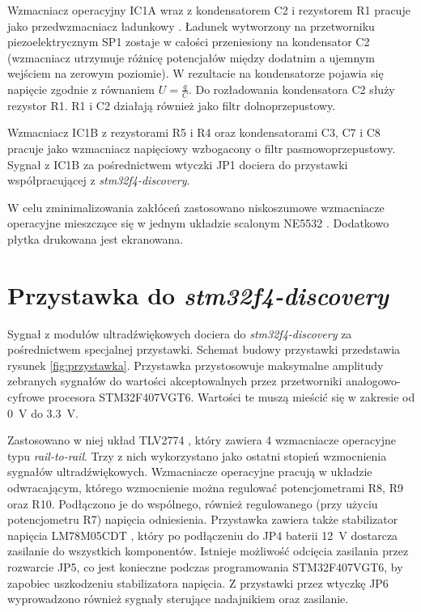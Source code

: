 
Wzmacniacz operacyjny IC1A wraz z kondensatorem C2 i rezystorem R1 pracuje 
jako przedwzmacniacz ładunkowy \cite{bib:wzm_ladunkowy}.
Ładunek wytworzony na przetworniku piezoelektrycznym SP1 zostaje w całości przeniesiony na kondensator C2 
(wzmacniacz utrzymuje różnicę potencjałów między dodatnim a ujemnym wejściem na zerowym poziomie).
W rezultacie na kondensatorze pojawia się napięcie zgodnie z równaniem $U=\frac{q}{C}$.
Do rozładowania kondensatora C2 służy rezystor R1.
R1 i C2 działają również jako filtr dolnoprzepustowy.

Wzmacniacz IC1B z rezystorami R5 i R4 oraz kondensatorami C3, C7 i C8 pracuje jako wzmacniacz napięciowy wzbogacony o 
filtr pasmowoprzepustowy.
Sygnał z IC1B za pośrednictwem wtyczki JP1 dociera do przystawki współpracującej z \textit{stm32f4-discovery}.

W celu zminimalizowania zakłóceń zastosowano niskoszumowe wzmacniacze operacyjne
mieszczące się w jednym układzie scalonym NE5532 \cite{bib:ne5532}. 
Dodatkowo płytka drukowana jest ekranowana.


\section{Przystawka do \textit{stm32f4-discovery}}

Sygnał z modułów ultradźwiękowych dociera do \textit{stm32f4-discovery} za pośrednictwem specjalnej przystawki.
Schemat budowy przystawki przedstawia rysunek \ref{fig:przystawka}.
Przystawka przystosowuje maksymalne amplitudy zebranych sygnałów do wartości akceptowalnych przez  
przetworniki analogowo-cyfrowe procesora STM32F407VGT6.
Wartości te muszą mieścić się w zakresie od \SI{0}{V} do \SI{3,3}{V}.

Zastosowano w niej układ TLV2774 \cite{bib:TLV2774}, który zawiera 4 wzmacniacze operacyjne typu
\textit{rail-to-rail}. Trzy z nich wykorzystano jako ostatni stopień wzmocnienia sygnałów ultradźwiękowych. 
Wzmacniacze operacyjne pracują w układzie odwracającym, którego wzmocnienie można regulować potencjometrami R8, R9 oraz R10. 
Podłączono je do wspólnego, również regulowanego (przy użyciu potencjometru R7) napięcia odniesienia.
Przystawka zawiera także stabilizator napięcia LM78M05CDT \cite{bib:LM78M05CDT}, który po podłączeniu 
do JP4 baterii \SI{12}{V} dostarcza zasilanie do wszystkich komponentów. 
Istnieje możliwość odcięcia zasilania przez rozwarcie JP5, co jest konieczne podczas programowania
STM32F407VGT6, by zapobiec uszkodzeniu stabilizatora napięcia.
Z przystawki przez wtyczkę JP6 wyprowadzono również sygnały sterujące nadajnikiem oraz zasilanie.

